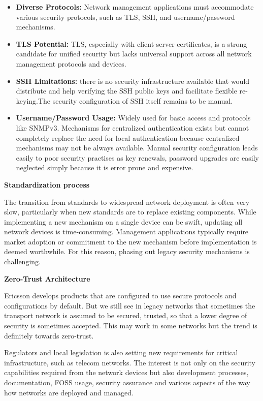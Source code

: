 \documentclass[11pt,sigconf]{iabart}
\begin{document}
\begin{itemize}
    \item \textbf{Diverse Protocols:} Network management applications must accommodate various security protocols, such as TLS, SSH, and username/password mechanisms.
    \item \textbf{TLS Potential:} TLS, especially with client-server certificates, is a strong candidate for unified security but lacks universal support across all network management protocols and devices. %
    \item \textbf{SSH Limitations:} there is no security infrastructure available that would distribute and help verifying the SSH public keys and facilitate flexible re-keying.The security configuration of SSH itself remains to be manual.
    \item \textbf{Username/Password Usage:} Widely used for basic access and protocols like SNMPv3. Mechanisms for centralized authentication exists but cannot completely replace the need for local authentication because centralized mechanisms may not be always available. Manual security configuration leads easily to poor security practises as key renewals, password upgrades are easily neglected simply because it is error prone and expensive.

\end{itemize}
 

\textbf{Standardization process}

The transition from standards to widespread network deployment is often very slow, particularly when new standards are to replace existing components. While implementing a new mechanism on a single device can be swift, updating all network devices is time-consuming. Management applications typically require market adoption or commitment to the new mechanism before implementation is deemed worthwhile. For this reason, phasing out legacy security mechanisms is challenging.
 
\textbf{Zero-Trust Architecture}

Ericsson develops products that are configured to use secure protocols and configurations by default. But we still see in legacy networks that sometimes the transport network is assumed to be secured, trusted, so that a lower degree of security is sometimes accepted. This may work in some networks but the trend is definitely towards zero-trust. 

Regulators and local legislation is also setting new requirements for critical infrastructure, such as telecom networks. The interest is not only on the security capabilities required from the network devices but also development processes, documentation, FOSS usage, security assurance and various aspects of the way how networks are deployed and managed.
\end{document}
